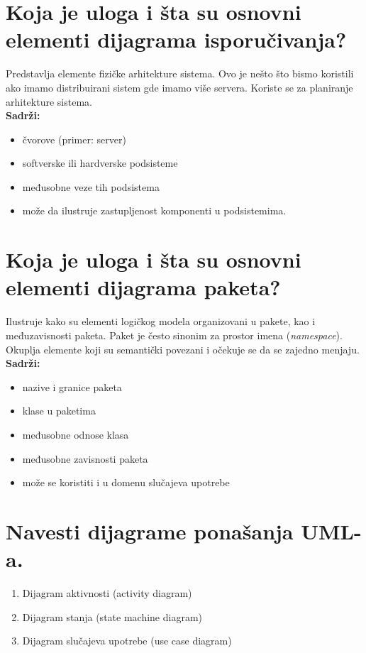 \documentclass[a4paper]{article}
\begin{document}
\section{Koja je uloga i šta su osnovni elementi dijagrama isporučivanja?}
  Predstavlja elemente fizičke arhitekture sistema. Ovo je nešto što bismo koristili 
  ako imamo distribuirani sistem gde imamo više servera. 
  Koriste se za planiranje arhitekture sistema. \\
  \textbf{Sadrži:}
  \begin{itemize} 
    \item čvorove (primer: server) 
    \item softverske ili hardverske podsisteme
    \item međusobne veze tih podsistema
    \item može da ilustruje zastupljenost komponenti u podsistemima.
  \end{itemize}

\section{Koja je uloga i šta su osnovni elementi dijagrama paketa?}
  Ilustruje kako su elementi logičkog modela organizovani u pakete, kao i međuzavisnosti paketa. 
  Paket je često sinonim za prostor imena (\textit{namespace}). Okuplja elemente koji su semantički 
  povezani i očekuje se da se zajedno menjaju. \\
  \textbf{Sadrži:}
  \begin{itemize}
    \item nazive i granice paketa
    \item klase u paketima
    \item međusobne odnose klasa
    \item međusobne zavisnosti paketa
    \item može se koristiti i u domenu slučajeva upotrebe
  \end{itemize}

\section{Navesti dijagrame ponašanja UML-a.}
  \begin{enumerate}
    \item Dijagram aktivnosti (activity diagram)
    \item Dijagram stanja (state machine diagram)
    \item Dijagram slučajeva upotrebe (use case diagram) 
  \end{enumerate}
\end{document}
